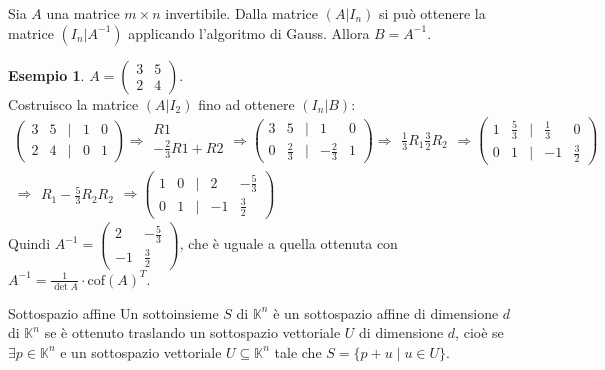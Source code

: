 \documentclass[a4paper]{article}
\theoremstyle{definition}
\newtheorem*{es}{Esempio}
\begin{document}
	Sia $A$ una matrice $m \times n$ invertibile.
	Dalla matrice $(A|I_n)$ si può ottenere la matrice $(I_n|A^{-1})$ applicando l'algoritmo di Gauss.
	Allora $B=A^{-1}$.
	\begin{es}
		$A = \begin{pmatrix}
			3 & 5 \\
			2 & 4
		\end{pmatrix}$. \\
		Costruisco la matrice $(A|I_2)$ fino ad ottenere $(I_n|B)$:
		\begin{align*}
			\begin{pmatrix}
				3 & 5 & \mid & 1 & 0 \\
				2 & 4 & \mid & 0 & 1
			\end{pmatrix} \Rightarrow \begin{matrix}
				R1 \\
				- \frac{2}{3}R1 + R2
			\end{matrix} \Rightarrow \begin{pmatrix}
				3 & 5 & \mid & 1 & 0 \\
				0 & \frac{2}{3} & \mid & - \frac{2}{3} & 1
			\end{pmatrix} \Rightarrow \begin{matrix}
				\frac{1}{3}R_1
				\frac{3}{2}R_2
			\end{matrix} \Rightarrow \begin{pmatrix}
				1 & \frac{5}{3} & \mid & \frac{1}{3} & 0 \\
				0 & 1 & \mid & -1 & \frac{3}{2}
			\end{pmatrix} \\ \Rightarrow \begin{matrix}
				R_1 - \frac{5}{3}R_2
				R_2
			\end{matrix} \Rightarrow \begin{pmatrix}
				1 & 0 & \mid & 2 & - \frac{5}{3} \\
				0 & 1 & \mid & -1 & \frac{3}{2}
			\end{pmatrix}
		\end{align*}
		Quindi $A^{-1} = \begin{pmatrix}
			2 & - \frac{5}{3} \\
			-1 & \frac{3}{2}
		\end{pmatrix}$, che è uguale a quella ottenuta con $A^{-1} = \frac{1}{\det A} \cdot \text{cof}(A)^T$.
	\end{es}
	\begin{deff}{Sottospazio affine}{}
		Un sottoinsieme $S$ di $\mathbb{K}^n$ è un sottospazio affine di dimensione $d$ di $\mathbb{K}^n$ se è ottenuto traslando un sottospazio vettoriale $U$ di dimensione $d$,
		cioè se $\exists p \in \mathbb{K}^n$ e un sottospazio vettoriale $U \subseteq \mathbb{K}^n$ tale che $S = \{p + u \mid u \in U\}$.
	\end{deff}
\end{document}
